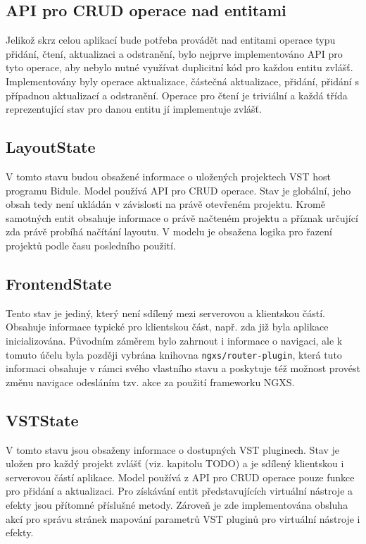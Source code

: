 \documentclass[thesis=M,czech]{FITthesis}[2019/03/06]
\begin{document}
	\subsection{API pro CRUD operace nad entitami}
	Jelikož skrz celou aplikací bude potřeba provádět nad entitami operace typu přidání, čtení, aktualizaci a odstranění, bylo nejprve implementováno API pro tyto operace, aby nebylo nutné využívat duplicitní
	kód pro každou entitu zvlášť. Implementovány byly operace aktualizace, částečná aktualizace, přidání,
	přidání s případnou aktualizací a odstranění. Operace pro čtení je triviální a každá třída reprezentující
	stav pro danou entitu jí implementuje zvlášť.						
	
	\subsection{LayoutState}
	V tomto stavu budou obsažené informace o uložených projektech VST host programu Bidule.
	Model používá API pro CRUD operace. Stav je globální, jeho obsah tedy není ukládán
	v závislosti na právě otevřeném projektu. Kromě samotných entit obsahuje informace o 
	právě načteném projektu a příznak určující zda právě probíhá načítání layoutu.
	V modelu je obsažena logika pro řazení projektů podle času posledního použití.			
	
	\subsection{FrontendState}
	Tento stav je jediný, který není sdílený mezi serverovou a klientskou částí.
	Obsahuje informace typické pro klientskou část, např. zda již byla aplikace inicializována.
	Původním záměrem bylo zahrnout i informace o navigaci, ale k tomuto
	účelu byla později vybrána knihovna \texttt{ngxs/router-plugin}, která tuto informaci
	obsahuje v rámci svého vlastního stavu a poskytuje též možnost provést změnu navigace
	odesláním tzv. akce za použití frameworku NGXS.
	
	\subsection{VSTState}
	V tomto stavu jsou obsaženy informace o dostupných VST pluginech. Stav je uložen 
	pro každý projekt zvlášť (viz. kapitolu TODO) a je sdílený klientskou i serverovou částí aplikace.
	Model používá z API pro CRUD operace pouze funkce pro přidání a aktualizaci.
	Pro získávání entit představujících virtuální nástroje a efekty jsou přítomné příslušné metody.
	Zároveň je zde implementována obsluha akcí pro správu stránek mapování parametrů
	VST pluginů pro virtuální nástroje i efekty.
	
\end{document}
